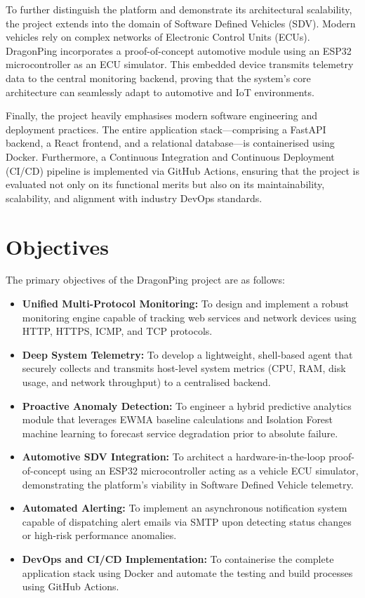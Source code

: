 \documentclass[12pt,a4paper,oneside]{report}
\begin{document}
\noindent To further distinguish the platform and demonstrate its architectural scalability, the project extends into the domain of Software Defined Vehicles (SDV). Modern vehicles rely on complex networks of Electronic Control Units (ECUs). DragonPing incorporates a proof-of-concept automotive module using an ESP32 microcontroller as an ECU simulator. This embedded device transmits telemetry data to the central monitoring backend, proving that the system's core architecture can seamlessly adapt to automotive and IoT environments. 

\noindent Finally, the project heavily emphasises modern software engineering and deployment practices. The entire application stack---comprising a FastAPI backend, a React frontend, and a relational database---is containerised using Docker. Furthermore, a Continuous Integration and Continuous Deployment (CI/CD) pipeline is implemented via GitHub Actions, ensuring that the project is evaluated not only on its functional merits but also on its maintainability, scalability, and alignment with industry DevOps standards.

\section{Objectives}
\noindent The primary objectives of the DragonPing project are as follows:
\begin{itemize}[label=\textbullet, leftmargin=*]
    \item \textbf{Unified Multi-Protocol Monitoring:} To design and implement a robust monitoring engine capable of tracking web services and network devices using HTTP, HTTPS, ICMP, and TCP protocols.
    \item \textbf{Deep System Telemetry:} To develop a lightweight, shell-based agent that securely collects and transmits host-level system metrics (CPU, RAM, disk usage, and network throughput) to a centralised backend.
    \item \textbf{Proactive Anomaly Detection:} To engineer a hybrid predictive analytics module that leverages EWMA baseline calculations and Isolation Forest machine learning to forecast service degradation prior to absolute failure.
    \item \textbf{Automotive SDV Integration:} To architect a hardware-in-the-loop proof-of-concept using an ESP32 microcontroller acting as a vehicle ECU simulator, demonstrating the platform's viability in Software Defined Vehicle telemetry.
    \item \textbf{Automated Alerting:} To implement an asynchronous notification system capable of dispatching alert emails via SMTP upon detecting status changes or high-risk performance anomalies.
    \item \textbf{DevOps and CI/CD Implementation:} To containerise the complete application stack using Docker and automate the testing and build processes using GitHub Actions.
\end{itemize}
\end{document}
